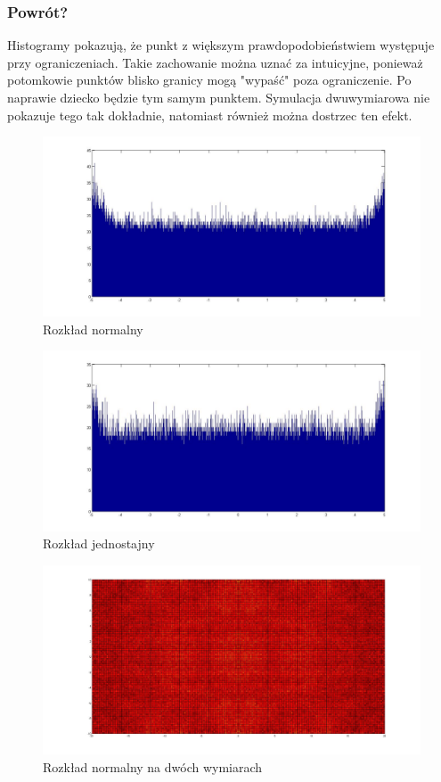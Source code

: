 \documentclass{mini}
\begin{document}
\subsubsection*{Powrót?}
Histogramy pokazują, że punkt z większym prawdopodobieństwiem występuje przy ograniczeniach. Takie zachowanie można uznać za intuicyjne, ponieważ potomkowie punktów blisko granicy mogą "wypaść" poza ograniczenie. Po naprawie dziecko będzie tym samym punktem. Symulacja dwuwymiarowa nie pokazuje tego tak dokładnie, natomiast również można dostrzec ten efekt.
\begin{figure}[H]
\centering
\includegraphics[width=\textwidth]{c_n_20M_1__5_5_2}
\caption{Rozkład normalny}
\end{figure}

\begin{figure}[H]
\centering
\includegraphics[width=\textwidth]{c_j_2M_1__5_5}
\caption{Rozkład jednostajny}
\end{figure}

\begin{figure}[H]
\centering
\includegraphics[width=\textwidth]{c_n_10M_2__20_20__10_10_4}
\caption{Rozkład normalny na dwóch wymiarach}
\end{figure}
\end{document}
